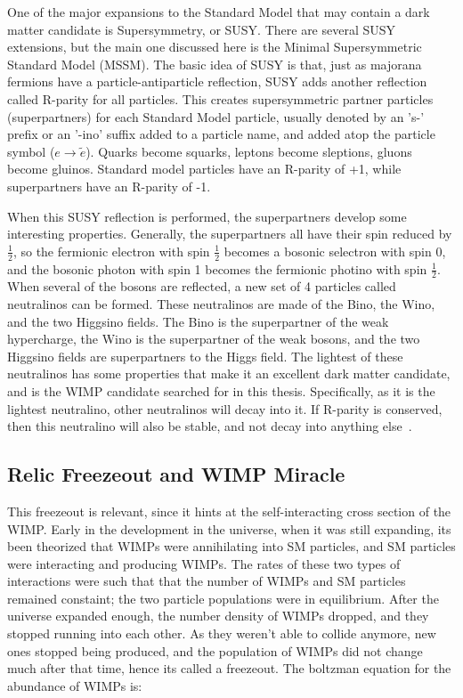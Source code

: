   One of the major expansions to the Standard Model that may contain a dark matter candidate is Supersymmetry, or SUSY.
  There are several SUSY extensions, but the main one discussed here is the Minimal Supersymmetric Standard Model (MSSM).
  The basic idea of SUSY is that, just as majorana fermions have a particle-antiparticle reflection, SUSY adds another reflection called R-parity for all particles. 
  This creates supersymmetric partner particles (superpartners) for each Standard Model particle, usually denoted by an 's-' prefix or an '-ino' suffix added to a particle name, and \nicetilde{} added atop the particle symbol ($e \rightarrow \tilde{e}$).
  Quarks become squarks, leptons become sleptions, gluons become gluinos.
  Standard model particles have an R-parity of +1, while superpartners have an R-parity of -1.
    
  When this SUSY reflection is performed, the superpartners develop some interesting properties.
  Generally, the superpartners all have their spin reduced by $\frac{1}{2}$, so the fermionic electron with spin $\frac{1}{2}$ becomes a bosonic selectron with spin $0$, and the bosonic photon with spin 1 becomes the fermionic photino with spin $\frac{1}{2}$.
  When several of the bosons are reflected, a new set of 4 particles called neutralinos can be formed.
  These neutralinos are made of the Bino, the Wino, and the two Higgsino fields.
  The Bino is the superpartner of the weak hypercharge, the Wino is the superpartner of the weak bosons, and the two Higgsino fields are superpartners to the Higgs field.
  The lightest of these neutralinos has some properties that make it an excellent dark matter candidate, and is the WIMP candidate searched for in this thesis.
  Specifically, as it is the lightest neutralino, other neutralinos will decay into it.
  If R-parity is conserved, then this neutralino will also be stable, and not decay into anything else~\cite{neutralino1,neutralino2,neutralino3}.
  
  \subsection{Relic Freezeout and WIMP Miracle}
  
  
  This freezeout is relevant, since it hints at the self-interacting cross section of the WIMP.
  Early in the development in the universe, when it was still expanding, its been theorized that WIMPs were annihilating into SM particles, and SM particles were interacting and producing WIMPs.
  The rates of these two types of interactions were such that that the number of WIMPs and SM particles remained constaint; the two particle populations were in equilibrium.
  After the universe expanded enough, the number density of WIMPs dropped, and they stopped running into each other.
  As they weren't able to collide anymore, new ones stopped being produced, and the population of WIMPs did not change much after that time, hence its called a freezeout.
  The boltzman equation for the abundance of WIMPs is:
  
